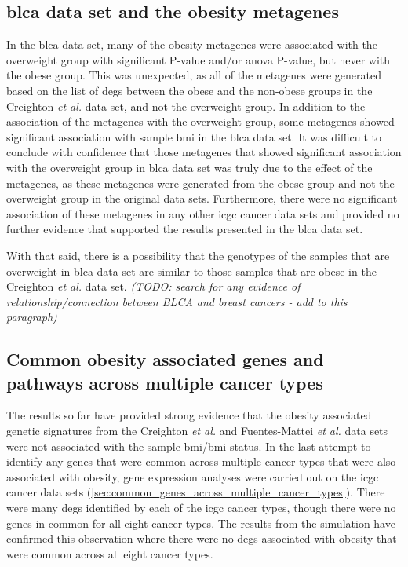 \subsection{\gls{blca} data set and the obesity metagenes}
\label{sub:blca_and_obesity_metagenes}

In the \gls{blca} data set, many of the obesity metagenes were associated with the overweight group with significant P-value and/or \gls{anova} P-value, but never with the obese group.
This was unexpected, as all of the metagenes were generated based on the list of \glspl{deg} between the obese and the non-obese groups in the Creighton \textit{et al.} data set, and not the overweight group.
In addition to the association of the metagenes with the overweight group, some metagenes showed significant association with sample \gls{bmi} in the \gls{blca} data set.
It was difficult to conclude with confidence that those metagenes that showed significant association with the overweight group in \gls{blca} data set was truly due to the effect of the metagenes, as these metagenes were generated from the obese group and not the overweight group in the original data sets.
Furthermore, there were no significant association of these metagenes in any other \gls{icgc} cancer data sets and provided no further evidence that supported the results presented in the \gls{blca} data set.

With that said, there is a possibility that the genotypes of the samples that are overweight in \gls{blca} data set are similar to those samples that are obese in the Creighton \textit{et al.} data set.
\textit{(TODO: search for any evidence of relationship/connection between BLCA and breast cancers - add to this paragraph)}

\subsection{Common obesity associated genes and pathways across multiple cancer types}
\label{sub:common_obesity_associated_genes_and_pathways_across_multiple_cancer_types}

The results so far have provided strong evidence that the obesity associated genetic signatures from the Creighton \textit{et al.} and Fuentes-Mattei \textit{et al.} data sets were not associated with the sample \gls{bmi}/\gls{bmi} status.
In the last attempt to identify any genes that were common across multiple cancer types that were also associated with obesity, gene expression analyses were carried out on the \gls{icgc} cancer data sets (\cref{sec:common_genes_across_multiple_cancer_types}).
There were many \glspl{deg} identified by each of the \gls{icgc} cancer types, though there were no genes in common for all eight cancer types.
The results from the simulation have confirmed this observation where there were no \glspl{deg} associated with obesity that were common across all eight cancer types.

